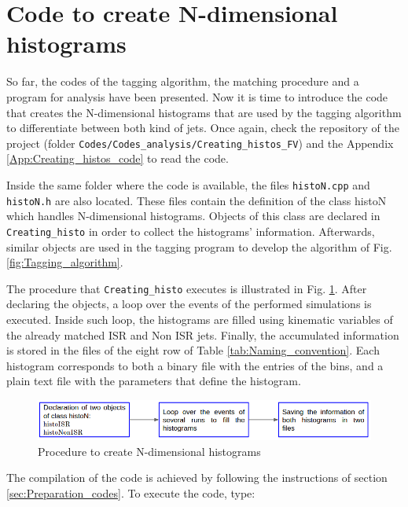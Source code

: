 \documentclass[12pt, oneside]{book}              %
\begin{document}
\section[Histograms code]{Code to create N-dimensional histograms} \label{sec: Creating_histo_code}

So far, the codes of the tagging algorithm, the matching procedure and a
program for analysis have been presented. Now it is time to introduce
the code that creates the N-dimensional histograms that are used 
by the tagging algorithm to differentiate between both kind of jets. Once again,
check the repository of the project (folder \texttt{Codes/Codes\_analysis/Creating\_histos\_FV})
and the Appendix \ref{App:Creating_histos_code} to read the code.

Inside the same folder where the code is available, the files \texttt{histoN.cpp}
and \texttt{histoN.h} are also located. These files contain the definition
of the class histoN which handles N-dimensional histograms. Objects of this 
class are declared in \texttt{Creating\_histo} in order to collect
the histograms' information. Afterwards, similar objects are used
in the tagging program to develop the algorithm of Fig.\ref{fig:Tagging_algorithm}.

The procedure that \texttt{Creating\_histo} executes is illustrated in
Fig. \ref{fig:Creating_histo}. After declaring the objects, a loop over
the events of the performed simulations is executed. Inside such loop, 
the histograms are filled using kinematic variables of the already
matched ISR and Non ISR jets. Finally, the accumulated information is
stored in the files of the eight row of Table \ref{tab:Naming_convention}.
Each histogram corresponds to both a binary file with the entries of the
bins, and a plain text file with the parameters that define the histogram.

\begin{figure}[h]
\centering
\includegraphics[width=1.0\linewidth]{./Imags_Doc/Creating_histo}
\caption[Procedure to create histograms]{Procedure to create N-dimensional histograms}
\label{fig:Creating_histo}
\end{figure}

The compilation of the code is achieved by following the instructions
of section \ref{sec:Preparation_codes}. To execute the code, type:
\end{document}
